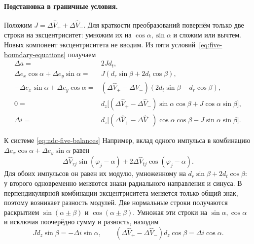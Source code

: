 

\paragraph{Подстановка в граничные условия.}
Положим $J=\Delta\widehat V_++\Delta\widehat V_-$.
Для краткости преобразований повернём только две строки
на эксцентриситет: умножим их на $\cos\alpha,\sin\alpha$
и сложим или вычтем. Новых компонент эксцентриситета не вводим.
Из пяти условий~\eqref{eq:five-boundary-equations} получаем
\begin{equation}
\begin{aligned}
 \Delta a={}&2Jd_t,\\
 \Delta e_x\cos\alpha+\Delta e_y\sin\alpha
       ={}&J(d_r\sin\beta+2d_t\cos\beta),\\
 -\Delta e_x\sin\alpha+\Delta e_y\cos\alpha
       ={}&(\Delta\widehat V_+-\Delta\widehat V_-)
                         (2d_t\sin\beta-d_r\cos\beta),\\
 0={}&d_z\bigl[(\Delta\widehat V_+-\Delta\widehat V_-)
                     \sin\alpha\cos\beta+J\cos\alpha\sin\beta\bigr],\\
 \Delta i={}&d_z\bigl[(\Delta\widehat V_+-\Delta\widehat V_-)
                     \cos\alpha\cos\beta-J\sin\alpha\sin\beta\bigr].
\end{aligned}
\label{eq:ndc-five-balances}
\end{equation}

\begin{explanation}{К системе \eqref{eq:ndc-five-balances}}
Например, вклад одного импульса в комбинацию
$\Delta e_x\cos\alpha+\Delta e_y\sin\alpha$ равен
\[
 \Delta\widehat V_{rj}\sin(\varphi_j-\alpha)
   +2\Delta\widehat V_{tj}\cos(\varphi_j-\alpha).
\]
Для обоих импульсов он равен их модулю, умноженному на
$d_r\sin\beta+2d_t\cos\beta$: у второго одновременно меняются
знаки радиального направления и синуса.
В перпендикулярной комбинации эксцентриситета меняется только
общий знак, поэтому возникает разность модулей.
Две нормальные строки получаются раскрытием
$\sin(\alpha\pm\beta)$ и $\cos(\alpha\pm\beta)$.
Умножая эти строки на $\sin\alpha,\cos\alpha$ и исключая
поочерёдно сумму и разность, находим
\[
 Jd_z\sin\beta=-\Delta i\sin\alpha,\qquad
 (\Delta\widehat V_+-\Delta\widehat V_-)d_z\cos\beta
       =\Delta i\cos\alpha.
\]
\end{explanation}


